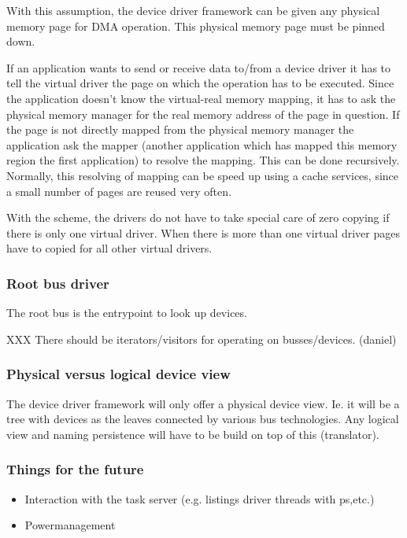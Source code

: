 \documentclass[9pt,a4paper]{extarticle}
\begin{document}
  With this assumption, the device driver framework can be given any
  physical memory page for DMA operation.  This physical memory page
  must be pinned down.
  
  If an application wants to send or receive data to/from a device
  driver it has to tell the virtual driver the page on which the
  operation has to be executed.  Since the application doesn't know
  the virtual-real memory mapping, it has to ask the physical memory
  manager for the real memory address of the page in question.  If the
  page is not directly mapped from the physical memory manager the
  application ask the mapper (another application which has mapped
  this memory region the first application) to resolve the mapping.
  This can be done recursively.  Normally, this resolving of mapping
  can be speed up using a cache services, since a small number of
  pages are reused very often.
  
  With the scheme, the drivers do not have to take special care of
  zero copying if there is only one virtual driver.  When there is
  more than one virtual driver pages have to copied for all other
  virtual drivers.

\subsubsection{Root bus driver}
  
  The root bus is the entrypoint to look up devices.
  
  XXX There should be iterators/visitors for operating on
  busses/devices.  (daniel)

\subsubsection{Physical versus logical device view}
  
  The device driver framework will only offer a physical device view.
  Ie. it will be a tree with devices as the leaves connected by
  various bus technologies.  Any logical view and naming persistence
  will have to be build on top of this (translator).

\subsubsection{Things for the future}

  \begin{itemize}
  \item Interaction with the task server (e.g. listings driver threads 
    with ps,etc.)
  \item Powermanagement
  \end{itemize}
\end{document}
